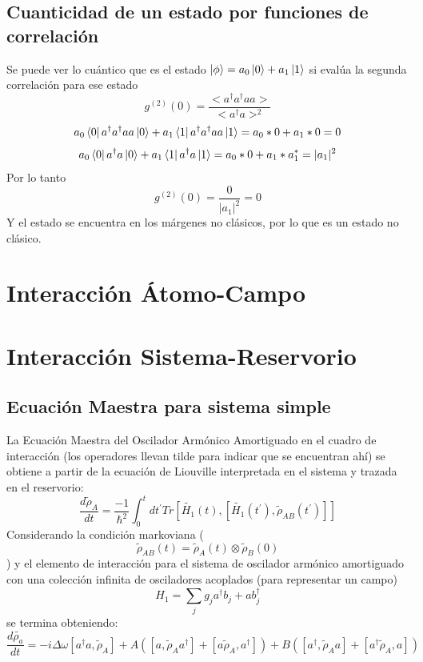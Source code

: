 \documentclass{book}
\begin{document}
       \subsection{Cuanticidad de un estado por funciones de correlación} Se puede ver lo cuántico que es el estado ${ \ket{\phi}=a_0\ket{0}+a_1\ket{1}}$ si evalúa la segunda correlación para ese estado \begin{equation}{ g^{(2)}(0)=\frac{<a^\dag a^\dag a a >}{<a^\dag a>^2}} \end{equation}
       \begin{equation}{a_0\bra{0}a^\dag a^\dag a a\ket{0}+a_1\bra{1}a^\dag a^\dag a a\ket{1}=a_0*0+a_1*0=0} \end{equation}
       \begin{equation}{a_0\bra{0}a^\dag a\ket{0}+a_1\bra{1}a^\dag a\ket{1}=a_0*0+a_1*a_1^*=\lvert a_1\rvert^2} \end{equation}
       Por lo tanto \begin{equation}{ g^{(2)}(0)=\frac{0}{\lvert a_1\rvert^2}=0} \end{equation}
       Y el estado se encuentra en los márgenes no clásicos, por lo que es un estado no clásico. 
   \section{Interacción Átomo-Campo}
   \section{Interacción Sistema-Reservorio}
       \subsection{Ecuación Maestra para sistema simple} La Ecuación Maestra del Oscilador Armónico Amortiguado en el cuadro de interacción (los operadores llevan tilde para indicar que se encuentran ahí) se obtiene a partir de la ecuación de Liouville interpretada en el sistema y trazada en el reservorio:
       \begin{equation}{ \frac{d\tilde{\rho}_A}{dt}=\frac{-1}{\hslash^2}\int_0^{t}dt^\prime Tr[\tilde{H_1}(t),[\tilde{H_1}(t^\prime),\tilde{\rho}_{AB}(t^\prime)]]} \end{equation}
       Considerando la condición markoviana (\begin{equation}\tilde{\rho}_{AB}(t)=\tilde{\rho}_A(t)\otimes\tilde{\rho}_B(0)\end{equation}) y el elemento de interacción para el sistema de oscilador armónico amortiguado con una colección infinita de osciladores acoplados (para representar un campo) \begin{equation}{H_1=\sum_j g_ja^\dag b_j+ab_j^\dag} \end{equation} se termina obteniendo:
       \begin{equation}{  \frac{d\tilde{\rho_a}}{dt}=-i\Delta\omega[a^\dag a,\tilde{\rho}_A]+A([a,\tilde{\rho}_Aa^\dag]+[a\tilde{\rho}_A,a^\dag])+B([a^\dag,\tilde{\rho}_Aa]+[a^\dag\tilde{\rho}_A,a])} \end{equation}
\end{document}
